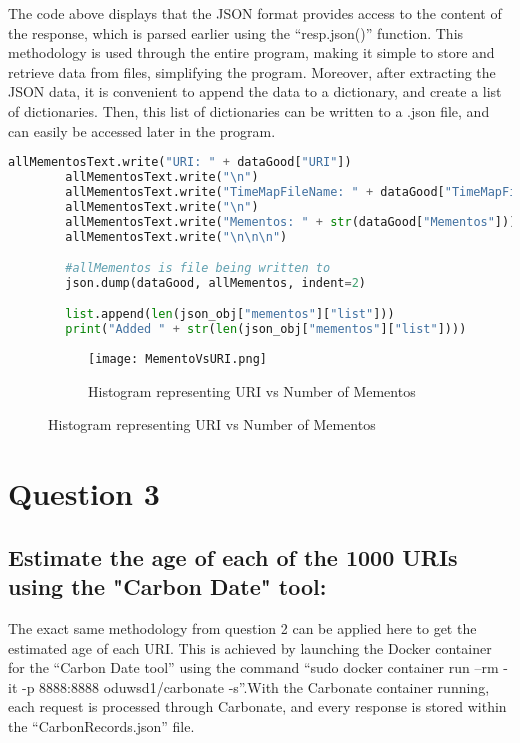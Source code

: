 \documentclass[11pt]{scrartcl} %
\begin{document}
\tabto{2.0cm}The code above displays that the JSON format provides access to the content of the response, which is parsed earlier using the ``resp.json()'' function. This methodology is used through the entire program, making it simple to store and retrieve data from files, simplifying the program. Moreover, after extracting the JSON data, it is convenient to append the data to a dictionary, and create a list of dictionaries. Then, this list of dictionaries can be written to a .json file, and can easily be accessed later in the program.

\begin{lstlisting}[language = Python, caption=Writing JSON to file]
allMementosText.write("URI: " + dataGood["URI"])
        allMementosText.write("\n")
        allMementosText.write("TimeMapFileName: " + dataGood["TimeMapFileName"])
        allMementosText.write("\n")
        allMementosText.write("Mementos: " + str(dataGood["Mementos"]))
        allMementosText.write("\n\n\n")

        #allMementos is file being written to
        json.dump(dataGood, allMementos, indent=2)

        list.append(len(json_obj["mementos"]["list"]))
        print("Added " + str(len(json_obj["mementos"]["list"])))
\end{lstlisting} 

\begin{figure}[h!]
\begin{subfigure}[b]{0.9\linewidth }
    \texttt{[image: MementoVsURI.png]}
    \caption{Histogram representing URI vs Number of Mementos}
\end{subfigure}
\end{figure}

\pagebreak
\section*{Question 3} \bigskip 

\subsection*{Estimate the age of each of the 1000 URIs using the "Carbon
Date" tool:}

\tabto{2.0cm}The exact same methodology from question 2 can be applied here to get the estimated age of each URI. This is achieved by launching the Docker container for the ``Carbon Date tool'' using the command ``sudo docker container run --rm -it -p 8888:8888 oduwsd1/carbonate -s''.\newline With the Carbonate container running, each request is processed through Carbonate, and every response is stored within the ``CarbonRecords.json'' file.
\end{document}
